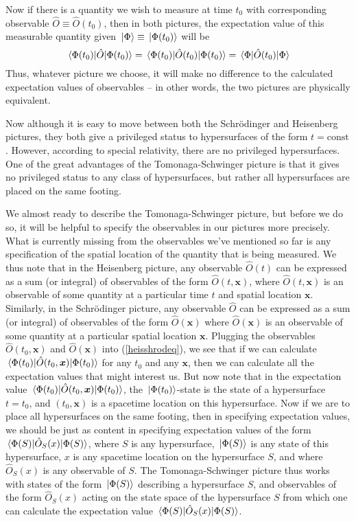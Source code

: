 Now if there is a quantity we wish to measure at time $t_0$ with corresponding observable $\hat{O}\equiv\hat{O}(t_0)$, then in both pictures, the expectation value of this measurable quantity given $\ket*{\Phi}\equiv\ket*{\Phi(t_0)}$ will be 
\begin{equation}\label{heisshrodeq}
  \ev*{\hat{O}}{\Phi(t_0)}=\ev*{\hat{O}(t_0)}{\Phi(t_0)}=\ev*{\hat{O}(t_0)}{\Phi}
\end{equation}
Thus, whatever picture we choose, it will make no difference to the calculated expectation values of observables -- in other words, the two pictures are physically equivalent.

Now although it is easy to move between both the Schr\"{o}dinger and Heisenberg pictures, they both give a privileged status to hypersurfaces of the form $t=\text{const}$. However, according to special relativity, there are no privileged hypersurfaces. One of the great advantages of the Tomonaga-Schwinger picture is that it gives no privileged status to any class of hypersurfaces, but rather all hypersurfaces are placed on the same footing.

We almost ready to describe the Tomonaga-Schwinger picture, but before we do so, it will be helpful to specify the observables in our pictures more precisely. What is currently missing from the observables we've mentioned so far is any specification of the spatial location of the quantity that is being measured. We thus note that in the Heisenberg picture, any observable $\hat{O}(t)$ can be expressed as a sum (or integral) of observables of the form $\hat{O}(t, \bm{x})$, where $\hat{O}(t, \bm{x})$ is an observable of some quantity at a particular time $t$ and spatial location $\bm{x}$. Similarly, in the Schr\"{o}dinger picture, any observable $\hat{O}$ can be expressed as a sum (or integral) of observables of the form $\hat{O}(\bm{x})$ where $\hat{O}(\bm{x})$ is an observable of some quantity at a particular spatial location $\bm{x}$. Plugging the observables $\hat{O}(t_0,\bm{x})$ and $\hat{O}(\bm{x})$ into (\ref{heisshrodeq}), we see that if we can calculate $\ev*{\hat{O}(t_0,\bm{x})}{\Phi(t_0)}$ for any $t_0$ and any $\bm{x}$, then we can calculate all the expectation values that might interest us. But now note that in the expectation value $\ev*{\hat{O}(t_0,\bm{x})}{\Phi(t_0)}$,  the $\ket*{\Phi(t_0)}$-state is the state of a hypersurface $t=t_0$, and $(t_0,\bm{x})$ is a spacetime location on this hypersurface. Now if we are to place all hypersurfaces on the same footing, then in specifying expectation values, we should be just as content in specifying expectation values of the form $\ev*{\hat{O}_S(x)}{\Phi(S)}$, where $S$ is any hypersurface, $\ket*{\Phi(S)}$ is any state of this hypersurface, $x$ is any spacetime location on the hypersurface $S$, and where $\hat{O}_S(x)$ is any observable of $S$. The Tomonaga-Schwinger picture thus works with states of the form $\ket*{\Phi(S)}$ describing a hypersurface $S$, and observables of the form $\hat{O}_S(x)$ acting on the state space of the hypersurface $S$ from which one can calculate the expectation value $\ev*{\hat{O}_S(x)}{\Phi(S)}$.

